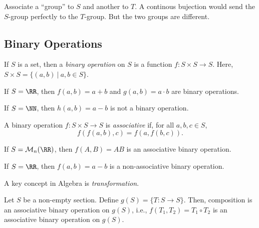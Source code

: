 \begin{sk}
	Associate a ``group'' to $S$ and another to $T$. A continous bujection would send the $S$-group perfectly to the $T$-group. But the two groups are different.
\end{sk}

\subsection{Binary Operations}

\begin{defn}
	If $S$ is a set, then a \emph{binary operation} on $S$ is a function $f: S \times S \to S$. Here,  $S \times S = \{(a, b)\ |\ a, b \in S\}$.
\end{defn}

\begin{exmp}
	If $S = \RR$, then  $f(a, b) = a+b$ and  $g(a, b) = a \cdot b$ are binary operations.
\end{exmp}

\begin{exmp}
	If $S = \NN$, then $h(a, b) = a - b$ is not a binary operation.
\end{exmp}

\begin{defn}
	A binary operation $f: S \times S \to S$ is \emph{associative} if, for all $a, b, c \in S$,  \[ f(f(a, b), c) = f(a, f(b, c)). \] 
\end{defn}

\begin{exmp}
	If $S = \mathcal{M}_n(\RR)$, then $f(A, B) = AB$ is an associative binary operation.
\end{exmp}

\begin{exmp}
	If $S = \RR$, then $f(a, b) = a - b$ is a non-associative binary operation.
\end{exmp}

A key concept in Algebra is \emph{transformation}.

\begin{exmp}
	Let $S$ be a non-empty section. Define $g(S) = \{T : S \to S\}$. Then, composition is an associative binary operation on  $g(S)$, i.e., $f(T_1, T_2) = T_1 \circ T_2$ is an associative binary operation on $g(S)$.
\end{exmp}

